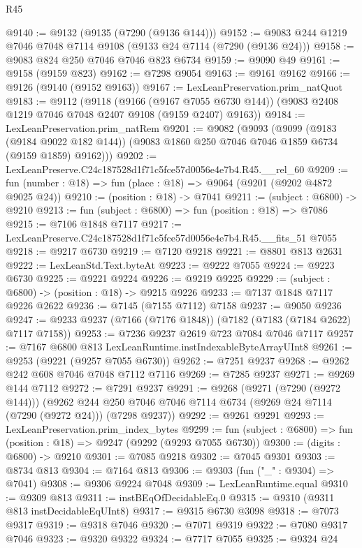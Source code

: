 \begin{lexlean}{R45}
\begin{coremodule}
{@9140 := @9132 (@9135 (@7290 (@9136 @144)))
@9152 := @9083 @244 @1219 @7046 @7048 @7114 @9108 (@9133 @24 @7114 (@7290 (@9136 @24)))
@9158 := @9083 @824 @250 @7046 @7046 @823 @6734
@9159 := @9090 @49
@9161 := @9158 (@9159 @823)
@9162 := @7298 @9054
@9163 := @9161 @9162
@9166 := @9126 (@9140 (@9152 @9163))
@9167 := LexLeanPreservation.prim_natQuot
@9183 := @9112
    (@9118
      (@9166 (@9167 @7055 @6730 @144))
      (@9083 @2408 @1219 @7046 @7048 @2407 @9108 (@9159 @2407) @9163))
@9184 := LexLeanPreservation.prim_natRem
@9201 := @9082
    (@9093
      (@9099
        (@9183 (@9184 @9022 @182 @144))
        (@9083 @1860 @250 @7046 @7046 @1859 @6734 (@9159 @1859) @9162)))
@9202 := LexLeanPreserve.C24c187528d1f71c5fce57d0056e4e7b4.R45.__rel_60
@9209 := fun (number : @18) => fun (place : @18) => @9064 (@9201 (@9202 @4872 @9025 @24))
@9210 := (position : @18) -> @7041
@9211 := (subject : @6800) -> @9210
@9213 := fun (subject : @6800) => fun (position : @18) => @7086
@9215 := @7106 @1848 @7117
@9217 := LexLeanPreserve.C24c187528d1f71c5fce57d0056e4e7b4.R45.__fits_51 @7055
@9218 := @9217 @6730
@9219 := @7120 @9218
@9221 := @8801 @813 @2631
@9222 := LexLeanStd.Text.byteAt
@9223 := @9222 @7055
@9224 := @9223 @6730
@9225 := @9221 @9224
@9226 := @9219 @9225
@9229 := (subject : @6800) -> (position : @18) -> @9215 @9226
@9233 := @7137 @1848 @7117 @9226 @2622
@9236 := @7145 (@7155 @7112) @7158
@9237 := @9050 @9236
@9247 := @9233 @9237 (@7166 (@7176 @1848)) (@7182 (@7183 (@7184 @2622) @7117 @7158))
@9253 := @7236 @9237 @2619 @723 @7084 @7046 @7117
@9257 := @7167 @6800 @813 LexLeanRuntime.instIndexableByteArrayUInt8
@9261 := @9253 (@9221 (@9257 @7055 @6730))
@9262 := @7251 @9237
@9268 := @9262 @242 @608 @7046 @7048 @7112 @7116
@9269 := @7285 @9237
@9271 := @9269 @144 @7112
@9272 := @7291 @9237
@9291 := @9268
    (@9271 (@7290 (@9272 @144)))
    (@9262 @244 @250 @7046 @7046 @7114 @6734 (@9269 @24 @7114 (@7290 (@9272 @24))) (@7298 @9237))
@9292 := @9261 @9291
@9293 := LexLeanPreservation.prim_index_bytes
@9299 := fun (subject : @6800) => fun (position : @18) => @9247 (@9292 (@9293 @7055 @6730))
@9300 := (digits : @6800) -> @9210
@9301 := @7085 @9218
@9302 := @7045 @9301
@9303 := @8734 @813
@9304 := @7164 @813
@9306 := @9303 (fun ("_" : @9304) => @7041)
@9308 := @9306 @9224 @7048
@9309 := LexLeanRuntime.equal
@9310 := @9309 @813
@9311 := instBEqOfDecidableEq.{0}
@9315 := @9310 (@9311 @813 instDecidableEqUInt8)
@9317 := @9315 @6730 @3098
@9318 := @7073 @9317
@9319 := @9318 @7046
@9320 := @7071 @9319
@9322 := @7080 @9317 @7046
@9323 := @9320 @9322
@9324 := @7717 @7055
@9325 := @9324 @24
}
\end{coremodule}
\end{lexlean}
